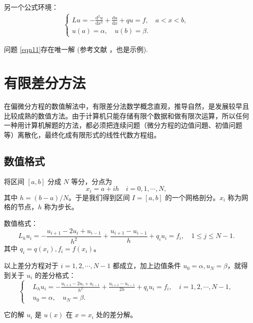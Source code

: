 \documentclass{shnuthesis}
\begin{document}
另一个公式环境：
\begin{eqnarray}\label{eqn12}
\left\{\begin{array}{l}
\displaystyle L u=-\frac{\mathrm{d}^{2} u}{\mathrm{d} x^{2}}+\frac{\mathrm{d} u}{\mathrm{d} x}+q u=f, \quad a < x < b, \\ [6pt]
\displaystyle u(a)=\alpha, \quad u(b)=\beta.
\end{array}\right.
\end{eqnarray}

问题 \eqref{eqn11}存在唯一解 (参考文献 \cite{Tadmor2012}，也是示例).


\section{有限差分方法}
在偏微分方程的数值解法中，有限差分法数学概念直观，推导自然，是发展较早且比较成熟的数值方法。由于计算机只能存储有限个数据和做有限次运算，所以任何一种用计算机解题的方法，都必须把连续问题（微分方程的边值问題、初值问题等）离散化，最终化成有限形式的线性代数方程组。

\subsection{数值格式}
将区间 $[a,b]$ 分成 $N$ 等分，分点为
\begin{equation*}
  x_{i}=a+i h \quad i=0,1, \cdots, N,
\end{equation*}
其中 $h=(b-a) / N$。于是我们得到区间 $I=[a,b]$ 的一个网格剖分。$x_i$ 称为网格的节点，$h$ 称为步长。

数值格式：
\begin{equation*}
  L_{h} u_{i}=-\frac{u_{i+1}-2 u_{i}+u_{i-1}}{h^{2}}+\frac{u_{i+1}-u_{i-1}}{h}+q_{i} u_{i}=f_{i},\quad 1 \leqslant j \leqslant N-1.
\end{equation*}
其中  $q_{i}=q(x_{i}), f_{i}=f(x_{i})$。

以上差分方程对于 $i=1,2, \cdots, N-1$ 都成立，加上边值条件 $u_{0}=\alpha, u_{N}=\beta$，就得到关于 $u_i$ 的差分格式：
\begin{equation}\label{equ21}
\left\{\begin{aligned}
& L_{h} u_{i}=-\frac{u_{i+1}-2 u_{i}+u_{i-1}}{h^{2}}+\frac{u_{i+1}-u_{i-1}}{2h}+q_{i} u_{i}=f_{i}, \quad i=1,2, \cdots, N-1, \\
& u_{0}=\alpha, \quad u_{N}=\beta.
\end{aligned}\right.
\end{equation}

它的解 $u_i$ 是 $u(x)$ 在 $x=x_i$ 处的差分解。
\end{document}
